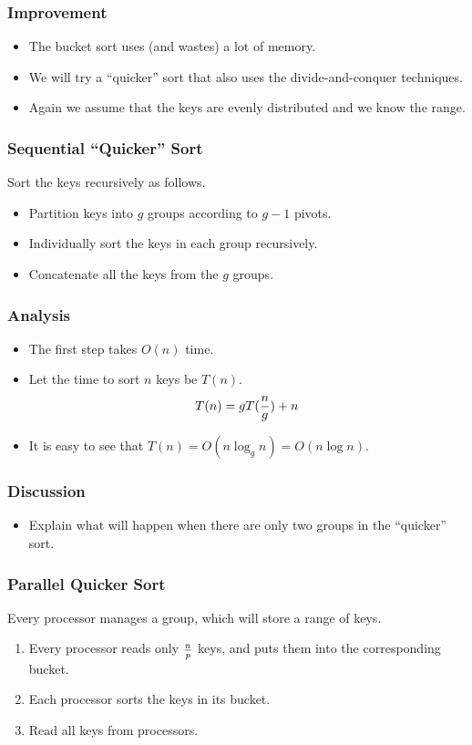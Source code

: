 \documentclass{beamer}
\begin{document}
\begin{CJK}{UTF8}{bsmi}
\begin{frame}
\frametitle{Improvement}
\begin{itemize}
\item The bucket sort uses (and wastes) a lot of memory.
\item We will try a ``quicker'' sort that also uses the
  divide-and-conquer techniques.
\item Again we assume that the keys are evenly distributed and we know
  the range.
\end{itemize}
\end{frame}

\begin{frame}
\frametitle{Sequential ``Quicker'' Sort}
Sort the keys recursively as follows.
\begin{itemize}
\item Partition keys into $g$ groups according to $g-1$ pivots.
\item Individually sort the keys in each group recursively.
\item Concatenate all the keys from the $g$ groups.
\end{itemize}
\end{frame}

\begin{frame}
\frametitle{Analysis}
\begin{itemize}
\item The first step takes $O(n)$ time.
\item Let the time to sort $n$ keys be $T(n)$.
\begin{equation}
T(n) = g T({n \over g}) + n
\end{equation}
\item It is easy to see that $T(n) = O(n \log_{g} n) = O(n \log n)$.
\end{itemize}
\end{frame}

\begin{frame}
\frametitle{Discussion}
\begin{itemize}
\item Explain what will happen when there are only two groups in the
  ``quicker'' sort.
\end{itemize}
\end{frame}

\begin{frame}
\frametitle{Parallel Quicker Sort}
Every processor manages a group, which will store a range of keys.
\begin{enumerate}
\item Every processor reads only $n \over p$ keys, and puts them into
  the corresponding bucket.
\item Each processor sorts the keys in its bucket.
\item Read all keys from processors.
\end{enumerate}
\end{frame}


\end{CJK}
\end{document}
